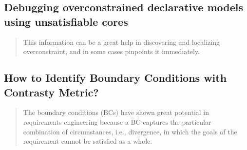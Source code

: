 \documentclass{article}
\begin{document}
\subsection*{Debugging overconstrained declarative models using unsatisfiable cores \cite{shlyakhter2003debugging}}
\begin{quote}
    This information can be a great help in discovering and localizing overconstraint, and in some cases pinpoints it immediately. 
\end{quote}

\subsection*{How to Identify Boundary Conditions with Contrasty Metric? \cite{luo2021identify}}
\begin{quote}
    The boundary conditions (BCs) have shown great potential in requirements engineering because a BC captures the particular combination of circumstances, i.e., divergence, in which the goals of the requirement cannot be satisfied as a whole.
\end{quote}






\end{document}

